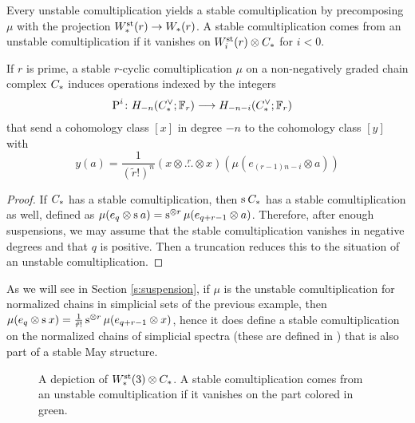 Every unstable comultiplication yields a stable comultiplication by precomposing $\mu$ with the projection $\Wst(r)\to \W(r)$. A stable comultiplication comes from an unstable comultiplication if it vanishes on $\Wst[i](r)\otimes \ucadenas$ for $i<0$.

\begin{proposition}
	If $r$ is prime, a stable $r$-cyclic comultiplication $\mu$ on a non-negatively graded chain complex $\ucadenas$ induces operations indexed by the integers
	\begin{align*}
		\power^{i}\colon H_{-n}(\ucocadenas;\mathbb{F}_r)&\lra H_{-n-i}(\ucocadenas;\mathbb{F}_r)
	\end{align*}
	that send a cohomology class $[x]$ in degree $-n$ to the cohomology class $[y]$ with
	\[
	y(a) = \frac{1}{(\tilde{r}!)^n}(x\otimes \overset{r}{\ldots}\otimes x)(\mu(e_{(r-1)n-i}\otimes a))
	\]
\end{proposition}
\begin{proof} If $\ucadenas$ has a stable comultiplication, then $\sus{} \ucadenas$ has a stable comultiplication as well, defined as $\mu(e_q\otimes \sus{} a) = \sus{\otimes r}\mu(e_{q+r-1}\otimes a)$. Therefore, after enough suspensions, we may assume that the stable comultiplication vanishes in negative degrees and that $q$ is positive. Then a truncation reduces this to the situation of an unstable comultiplication.
\end{proof}
\begin{example}
	As we will see in Section \ref{s:suspension}, if $\mu$ is the unstable comultiplication for normalized chains in simplicial sets of the previous example, then $\mu(e_q\otimes \sus{} x) = \frac{1}{\tilde{r}!}\sus{\otimes r} \mu(e_{q+r-1}\otimes x)$, hence it does define a stable comultiplication on the normalized chains of simplicial spectra (these are defined in \cite{Gill2020}) that is also part of a stable May structure.
\end{example}


\begin{figure}

\caption{A depiction of $\Wst(3)\otimes \ucadenas$. A stable comultiplication comes from an unstable comultiplication if it vanishes on the part colored in green. }
\end{figure}



